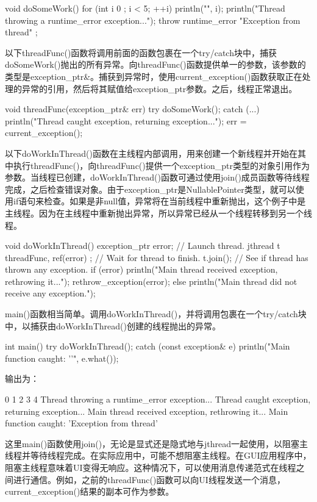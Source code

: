 \begin{cpp}
void doSomeWork()
{
    for (int i { 0 }; i < 5; ++i) { println("{}", i); }
    println("Thread throwing a runtime_error exception...");
    throw runtime_error { "Exception from thread" };
}
\end{cpp}

以下threadFunc()函数将调用前面的函数包裹在一个try/catch块中，捕获doSomeWork()抛出的所有异常。向threadFunc()函数提供单一的参数，该参数的类型是exception\_ptr\&。捕获到异常时，使用current\_exception()函数获取正在处理的异常的引用，然后将其赋值给exception\_ptr参数。之后，线程正常退出。

\begin{cpp}
void threadFunc(exception_ptr& err)
{
    try {
        doSomeWork();
    } catch (...) {
        println("Thread caught exception, returning exception...");
        err = current_exception();
    }
}
\end{cpp}

以下doWorkInThread()函数在主线程内部调用，用来创建一个新线程并开始在其中执行threadFunc()，向threadFunc()提供一个exception\_ptr类型的对象引用作为参数。当线程已创建，doWorkInThread()函数可通过使用join()成员函数等待线程完成，之后检查错误对象。由于exception\_ptr是NullablePointer类型，就可以使用if语句来检查。如果是非null值，异常将在当前线程中重新抛出，这个例子中是主线程。因为在主线程中重新抛出异常，所以异常已经从一个线程转移到另一个线程。

\begin{cpp}
void doWorkInThread()
{
    exception_ptr error;
    // Launch thread.
    jthread t { threadFunc, ref(error) };
    // Wait for thread to finish.
    t.join();
    // See if thread has thrown any exception.
    if (error) {
        println("Main thread received exception, rethrowing it...");
        rethrow_exception(error);
    } else {
        println("Main thread did not receive any exception.");
    }
}
\end{cpp}

main()函数相当简单。调用doWorkInThread()，并将调用包裹在一个try/catch块中，以捕获由doWorkInThread()创建的线程抛出的异常。

\begin{cpp}
int main()
{
    try {
        doWorkInThread();
    } catch (const exception& e) {
        println("Main function caught: '{}'", e.what());
    }
}
\end{cpp}

输出为：

\begin{shell}
0
1
2
3
4
Thread throwing a runtime_error exception...
Thread caught exception, returning exception...
Main thread received exception, rethrowing it...
Main function caught: 'Exception from thread'
\end{shell}

这里main()函数使用join()，无论是显式还是隐式地与jthread一起使用，以阻塞主线程并等待线程完成。在实际应用中，可能不想阻塞主线程。在GUI应用程序中，阻塞主线程意味着UI变得无响应。这种情况下，可以使用消息传递范式在线程之间进行通信。例如，之前的threadFunc()函数可以向UI线程发送一个消息，current\_exception()结果的副本可作为参数。




